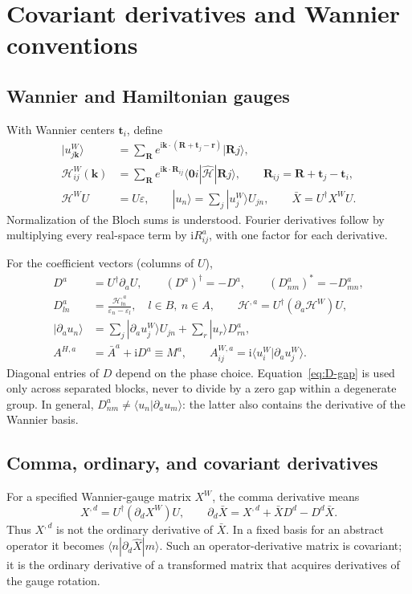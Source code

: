 \documentclass[prx,amsmath,amssymb,superscriptaddress,longbibliography]{revtex4-2}
\newcommand{\ii}{\mathrm{i}}
\begin{document}
\section{Covariant derivatives and Wannier conventions}
\label{sec:covariant}

\subsection{Wannier and Hamiltonian gauges}
With Wannier centers $\bm t_i$, define
\begin{align}
 |u_{j\bm k}^{W}\rangle
 &=\sum_{\bm R}e^{\ii\bm k\cdot(\bm R+\bm t_j-\bm r)}|\bm Rj\rangle,
 \\
 \mathcal H_{ij}^{W}(\bm k)
 &=\sum_{\bm R}e^{\ii\bm k\cdot\bm R_{ij}}
 \langle\bm0 i|\hat{\mathcal H}|\bm Rj\rangle,
 \qquad \bm R_{ij}=\bm R+\bm t_j-\bm t_i,
 \label{eq:fourier}\\
 \mathcal H^W U&=U\varepsilon,\qquad
 |u_n\rangle=\sum_j|u_j^W\rangle U_{jn},\qquad
 \bar X=U^\dagger X^W U.
 \label{eq:gauges}
\end{align}
Normalization of the Bloch sums is understood.
Fourier derivatives follow by multiplying every real-space term by
$\ii R_{ij}^a$, with one factor for each derivative.

For the coefficient vectors (columns of $U$),
\begin{align}
 D^a&=U^\dagger\partial_a U,\qquad
 (D^a)^\dagger=-D^a,\qquad (D_{nm}^a)^*=-D_{mn}^a,
 \label{eq:D}\\
 D_{ln}^a&=\frac{\mathcal H_{ln}^{,a}}{\varepsilon_n-\varepsilon_l},
 \quad l\in B,\ n\in A,\qquad
 \mathcal H^{,a}=U^\dagger(\partial_a\mathcal H^W)U,
 \label{eq:D-gap}\\
 |\partial_a u_n\rangle
 &=\sum_j|\partial_a u_j^W\rangle U_{jn}+\sum_r|u_r\rangle D_{rn}^a,
 \\
 A^{H,a}&=\bar A^a+\ii D^a\equiv M^a,\qquad
 A_{ij}^{W,a}=\ii\langle u_i^W|\partial_a u_j^W\rangle.
 \label{eq:M}
\end{align}
Diagonal entries of $D$ depend on the phase choice.
Equation~\eqref{eq:D-gap} is used only across separated blocks, never to divide
by a zero gap within a degenerate group.
In general, $D_{nm}^a\ne\langle u_n|\partial_a u_m\rangle$:
the latter also contains the derivative of the Wannier basis.

\subsection{Comma, ordinary, and covariant derivatives}
\label{sec:derivative-conventions}
For a specified Wannier-gauge matrix $X^W$, the comma derivative means
\begin{equation}
 X^{,d}=U^\dagger(\partial_d X^W)U,\qquad
 \partial_d\bar X=X^{,d}+\bar X D^d-D^d\bar X.
 \label{eq:ordinary-derivative}
\end{equation}
Thus $X^{,d}$ is not the ordinary derivative of $\bar X$.
In a fixed basis for an abstract operator it becomes
$\langle n|\partial_d\hat X|m\rangle$.
Such an operator-derivative matrix is covariant; it is the ordinary derivative
of a transformed matrix that acquires derivatives of the gauge rotation.
\end{document}
